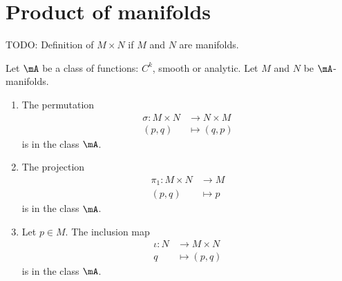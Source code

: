 \section{Product of manifolds}

\begin{definition}      \label{DEFooYOLXooDPrnHa}
	TODO: Definition of \( M\times N\) if \( M\) and \( N\) are manifolds.
\end{definition}


\begin{proposition}      \label{PROPooCHVLooVFScOl}
	Let \( \mA\) be a class of functions: \( C^k\), smooth or analytic.  Let \( M\) and \( N\) be \( \mA\)-manifolds.
	\begin{enumerate}
		\item
		      The permutation
		      \begin{equation}
			      \begin{aligned}
				      \sigma\colon M\times N & \to N\times M \\
				      (p,q)                  & \mapsto (q,p)
			      \end{aligned}
		      \end{equation}
		      is in the class \( \mA\).
		\item       \label{ITEMooRFFAooRSeBPl}
		      The projection
		      \begin{equation}
			      \begin{aligned}
				      \pi_1\colon M\times N & \to M     \\
				      (p,q)                 & \mapsto p
			      \end{aligned}
		      \end{equation}
		      is in the class \( \mA\).
		\item
		      Let \( p\in M\). The inclusion map
		      \begin{equation}
			      \begin{aligned}
				      \iota\colon N & \to M\times N \\
				      q             & \mapsto (p,q)
			      \end{aligned}
		      \end{equation}
		      is in the class \( \mA\).
	\end{enumerate}
\end{proposition}

